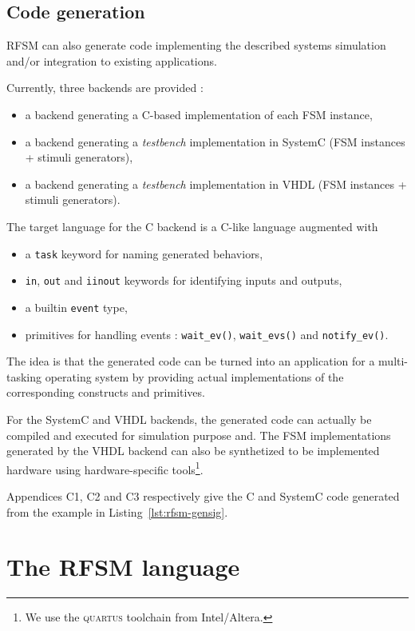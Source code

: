 \subsection*{Code generation}
\label{sec:code-generation-1}

RFSM can also generate code implementing the described systems simulation and/or
integration to existing applications.

\medskip
Currently, three backends are provided :
\begin{itemize}
\item a backend generating a C-based implementation of each FSM instance,
\item a backend generating a \emph{testbench} implementation in SystemC (FSM instances + stimuli
  generators),
\item a backend generating a \emph{testbench} implementation in VHDL (FSM instances + stimuli
  generators).
\end{itemize}

\medskip
The target language for the C backend is a C-like language augmented with
\begin{itemize}
\item a \verb|task| keyword for naming generated behaviors,
\item \verb|in|, \verb|out| and \verb|iinout| keywords for identifying inputs and outputs,
\item a builtin \verb|event| type,
\item primitives for handling events : \verb|wait_ev()|, \verb|wait_evs()| and
  \verb|notify_ev()|. 
\end{itemize}
The idea is that the generated code can be turned into an application for a multi-tasking operating
system by providing actual implementations of the corresponding constructs and primitives.

\medskip
For the SystemC and VHDL backends, the generated code can actually be compiled and executed for
simulation purpose and. The FSM implementations generated by the VHDL backend can also be
synthetized to be implemented hardware using hardware-specific tools\footnote{We use the
  \textsc{quartus} toolchain from Intel/Altera.}. 

\medskip
Appendices C1, C2 and C3 respectively give the C and SystemC code generated from the example in
Listing~\ref{lst:rfsm-gensig}. 

\section{The RFSM language}
\label{sec:rfsm-language}

